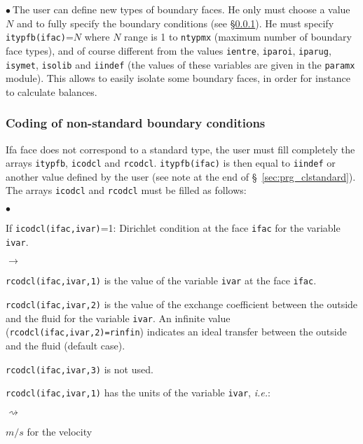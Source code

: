 {{{\noindent
$\bullet\ $The user can define new types of boundary faces. He only must
choose a value $N$ and to fully specify the boundary conditions (see
\S\ref{sec:prg_clnonstandard}). He must specify
\texttt{itypfb(ifac)}=$N$ where $N$ range is 1 to
\texttt{ntypmx} (maximum number of boundary face types), and of
course different from the values \texttt{ientre}, \texttt{iparoi},
\texttt{iparug}, \texttt{isymet}, \texttt{isolib} and \texttt{iindef} (the values
of these variables are given in the \texttt{paramx} module). This allows to
easily isolate some boundary faces, in order for instance to calculate balances.

\subsubsection{Coding of non-standard boundary conditions}
\label{sec:prg_clnonstandard}%
Ifa face does not correspond to a standard type, the user
must fill completely the arrays \texttt{itypfb}, \texttt{icodcl} and
\texttt{rcodcl}. \texttt{itypfb(ifac)} is then equal to \texttt{iindef}
or another value defined by the user (see note at the end of \S~\ref{sec:prg_clstandard}). The arrays \texttt{icodcl} and \texttt{rcodcl}
must be filled as follows:

\begin{list}{$\bullet$}{}
\item If \texttt{icodcl(ifac,ivar)}=1: Dirichlet condition at the face
      \texttt{ifac} for the variable \texttt{ivar}.

\begin{list}{$\rightarrow$}{}
\item \texttt{rcodcl(ifac,ivar,1)} is the value of the variable \texttt{ivar}
      at the face \texttt{ifac}.

\item \texttt{rcodcl(ifac,ivar,2)} is the value of the exchange coefficient
      between the outside and the fluid for the variable \texttt{ivar}. An
      infinite value (\texttt{rcodcl(ifac,ivar,2)=rinfin}) indicates an
      ideal transfer between the outside and the fluid (default case).

\item \texttt{rcodcl(ifac,ivar,3)} is not used.

\item \texttt{rcodcl(ifac,ivar,1)} has the units of the variable
      \texttt{ivar}, {\em i.e.}:
\begin{list}{$\rightsquigarrow$}{}
\item $m/s$ for the velocity


\end{list}
\end{list}
\end{list}}}}
